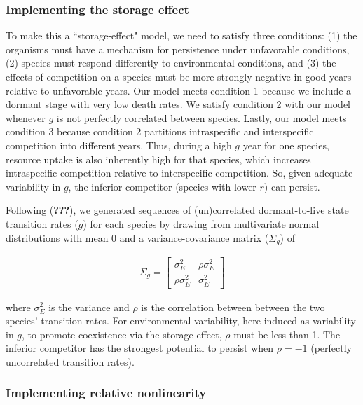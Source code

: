 \documentclass[12pt,]{article}
\begin{document}
\subsubsection{Implementing the storage
effect}\label{implementing-the-storage-effect}

To make this a ``storage-effect" model, we need to satisfy three
conditions: (1) the organisms must have a mechanism for persistence
under unfavorable conditions, (2) species must respond differently to
environmental conditions, and (3) the effects of competition on a
species must be more strongly negative in good years relative to
unfavorable years. Our model meets condition 1 because we include a
dormant stage with very low death rates. We satisfy condition 2 with our
model whenever \(g\) is not perfectly correlated between species.
Lastly, our model meets condition 3 because condition 2 partitions
intraspecific and interspecific competition into different years. Thus,
during a high \(g\) year for one species, resource uptake is also
inherently high for that species, which increases intraspecific
competition relative to interspecific competition. So, given adequate
variability in \(g\), the inferior competitor (species with lower \(r\))
can persist.

Following ({\textbf{???}}), we generated sequences of (un)correlated
dormant-to-live state transition rates (\(g\)) for each species by
drawing from multivariate normal distributions with mean 0 and a
variance-covariance matrix (\(\Sigma_g\)) of

\begin{align}
\Sigma_g = 
\begin{bmatrix}
\sigma^2_{E} & \rho\sigma^2_{E} \\
\rho\sigma^2_{E} & \sigma^2_{E}
\end{bmatrix}
\end{align}

\noindent{}where \(\sigma^2_{E}\) is the variance and \(\rho\) is the
correlation between between the two species' transition rates. For
environmental variability, here induced as variability in \(g\), to
promote coexistence via the storage effect, \(\rho\) must be less than
1. The inferior competitor has the strongest potential to persist when
\(\rho=-1\) (perfectly uncorrelated transition rates).

\subsubsection{Implementing relative
nonlinearity}\label{implementing-relative-nonlinearity}
\end{document}
